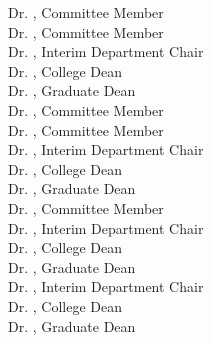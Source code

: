 \begin{titlepage}
Dr. \commemb, Committee Member\\
Dr. \commemc, Committee Member\\
Dr. \depchair, Interim Department Chair\\
Dr. \colldean, College Dean\\
Dr. \graddean, Graduate Dean\\
\else
\ifdefined\commemb
Dr. \commema, Committee Member\\
Dr. \commemb, Committee Member\\
Dr. \depchair, Interim Department Chair\\
Dr. \colldean, College Dean\\
Dr. \graddean, Graduate Dean\\
\else
\ifdefined\commema
Dr. \commema, Committee Member\\
Dr. \depchair, Interim Department Chair\\
Dr. \colldean, College Dean\\
Dr. \graddean, Graduate Dean\\
\else
Dr. \depchair, Interim Department Chair\\
Dr. \colldean, College Dean\\
Dr. \graddean, Graduate Dean\\
\fi
\fi
\fi
\fi
\fi
\fi
\fi
\fi
\fi
\end{titlepage}

\newpage
\restoregeometry
